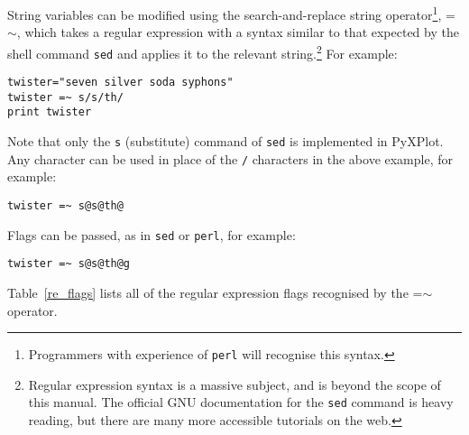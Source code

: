 String variables can be modified using the search-and-replace string
operator\footnote{Programmers with
experience of {\tt perl} will recognise this syntax.}, =$\sim$, which takes a regular expression with a syntax similar to that
expected by the shell command {\tt sed} and applies it to the relevant string.\footnote{Regular expression
syntax is a massive subject, and is beyond the scope of this manual. The
official GNU documentation for the {\tt sed} command is heavy reading, but
there are many more accessible tutorials on the web.} For example:

\begin{verbatim}
twister="seven silver soda syphons"
twister =~ s/s/th/
print twister
\end{verbatim}

Note that only the {\tt s} (substitute) command of {\tt sed} is implemented in
PyXPlot. Any character can be used in place of the {\tt /} characters in the
above example, for example:

\begin{verbatim}
twister =~ s@s@th@
\end{verbatim}

\noindent Flags can be passed, as in {\tt sed} or {\tt perl}, for example:

\begin{verbatim}
twister =~ s@s@th@g
\end{verbatim}

\noindent Table~\ref{re_flags} lists all of the regular expression flags
recognised by the =$\sim$ operator.

